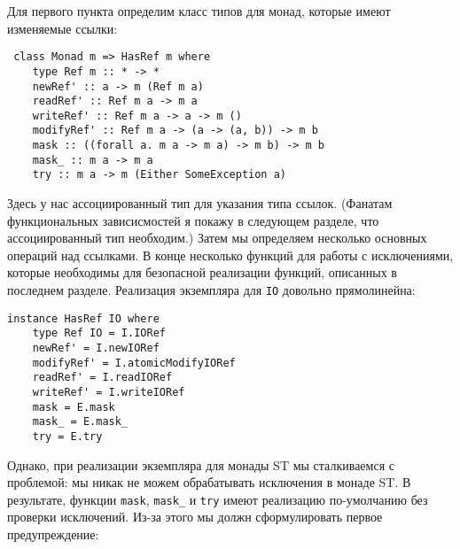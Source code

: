 Для первого пункта определим класс типов для монад, которые имеют изменяемые ссылки:
\begin{lstlisting}
 class Monad m => HasRef m where
    type Ref m :: * -> *
    newRef' :: a -> m (Ref m a)
    readRef' :: Ref m a -> m a
    writeRef' :: Ref m a -> a -> m ()
    modifyRef' :: Ref m a -> (a -> (a, b)) -> m b
    mask :: ((forall a. m a -> m a) -> m b) -> m b
    mask_ :: m a -> m a
    try :: m a -> m (Either SomeException a)
\end{lstlisting}

Здесь у нас ассоциированный тип для указания типа ссылок. (Фанатам функциональных 
зависисмостей я покажу в следующем разделе, что ассоциированный тип необходим.) 
Затем мы определяем несколько основных операций над ссылками.
В конце несколько функций для работы с
исключениями, которые необходимы для безопасной реализации функций, описанных в
последнем разделе. Реализация экземпляра для \verb'IO' довольно прямолинейна:
  
\begin{lstlisting}
instance HasRef IO where
    type Ref IO = I.IORef
    newRef' = I.newIORef
    modifyRef' = I.atomicModifyIORef
    readRef' = I.readIORef
    writeRef' = I.writeIORef
    mask = E.mask
    mask_ = E.mask_
    try = E.try 
\end{lstlisting}

Однако, при реализации экземпляра для монады ST мы сталкиваемся с проблемой: мы никак не можем
обрабатывать исключения в монаде ST. В результате, функции \lstinline'mask',
\lstinline'mask_' и \lstinline'try' имеют
реализацию по-умолчанию без проверки исключений. Из-за этого мы должн сформулировать первое
предупреждение:


